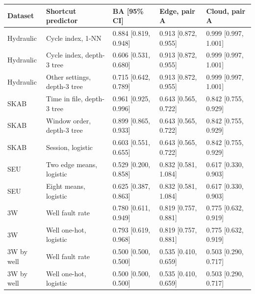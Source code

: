 \begin{tabular}{@{}l l l ll@{}}
\toprule
Dataset & Shortcut predictor & BA [95\% CI] & Edge, pair A & Cloud, pair A \\
\midrule
Hydraulic & Cycle index, 1-NN & 0.884 [0.819, 0.948] & 0.913 [0.872, 0.955] & 0.999 [0.997, 1.001] \\
Hydraulic & Cycle index, depth-3 tree & 0.606 [0.531, 0.680] & 0.913 [0.872, 0.955] & 0.999 [0.997, 1.001] \\
Hydraulic & Other settings, depth-3 tree & 0.715 [0.642, 0.789] & 0.913 [0.872, 0.955] & 0.999 [0.997, 1.001] \\
SKAB & Time in file, depth-3 tree & 0.961 [0.925, 0.996] & 0.643 [0.565, 0.722] & 0.842 [0.755, 0.929] \\
SKAB & Window order, depth-3 tree & 0.899 [0.865, 0.933] & 0.643 [0.565, 0.722] & 0.842 [0.755, 0.929] \\
SKAB & Session, logistic & 0.603 [0.551, 0.655] & 0.643 [0.565, 0.722] & 0.842 [0.755, 0.929] \\
SEU & Two edge means, logistic & 0.529 [0.200, 0.858] & 0.832 [0.581, 1.084] & 0.617 [0.330, 0.903] \\
SEU & Eight means, logistic & 0.625 [0.387, 0.863] & 0.832 [0.581, 1.084] & 0.617 [0.330, 0.903] \\
3W & Well fault rate & 0.780 [0.611, 0.949] & 0.819 [0.757, 0.881] & 0.775 [0.632, 0.919] \\
3W & Well one-hot, logistic & 0.793 [0.619, 0.968] & 0.819 [0.757, 0.881] & 0.775 [0.632, 0.919] \\
3W by well & Well fault rate & 0.500 [0.500, 0.500] & 0.535 [0.410, 0.659] & 0.503 [0.290, 0.717] \\
3W by well & Well one-hot, logistic & 0.500 [0.500, 0.500] & 0.535 [0.410, 0.659] & 0.503 [0.290, 0.717] \\
\bottomrule
\end{tabular}
